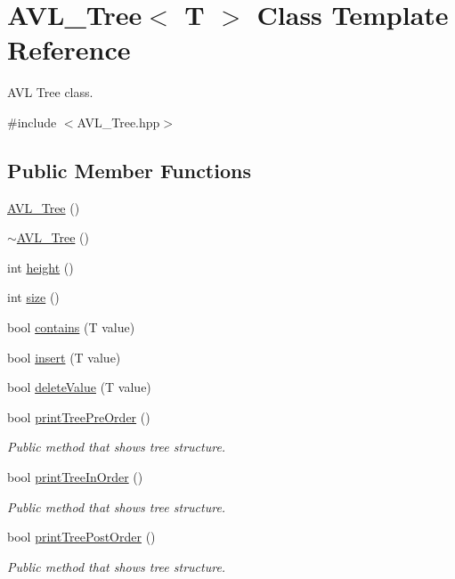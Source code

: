 \hypertarget{class_a_v_l___tree}{}\section{A\+V\+L\+\_\+\+Tree$<$ T $>$ Class Template Reference}
\label{class_a_v_l___tree}


A\+VL Tree class.  




{\ttfamily \#include $<$A\+V\+L\+\_\+\+Tree.\+hpp$>$}

\subsection*{Public Member Functions}
\begin{DoxyCompactItemize}
\item 
\hyperlink{class_a_v_l___tree_a129151ce51f97168c7cd9c84a6b17500}{A\+V\+L\+\_\+\+Tree} ()
\item 
\hyperlink{class_a_v_l___tree_a082bb7b47a8351639059e7063b97a114}{$\sim$\+A\+V\+L\+\_\+\+Tree} ()
\item 
int \hyperlink{class_a_v_l___tree_a74bbdd68e0767102ed33dc9253a76b7e}{height} ()
\item 
int \hyperlink{class_a_v_l___tree_ab865e8048400cb149e11f4bcb5c6f9b2}{size} ()
\item 
bool \hyperlink{class_a_v_l___tree_a2384f725aba6caf38392b77414514815}{contains} (T value)
\item 
bool \hyperlink{class_a_v_l___tree_a95d4d0b742c901ba78fcb2e5a91fed08}{insert} (T value)
\item 
bool \hyperlink{class_a_v_l___tree_a08b1c0b73d635728ea024edf0748e13d}{delete\+Value} (T value)
\item 
bool \hyperlink{class_a_v_l___tree_a2dbb95af3faf3933837ceeb478dd718f}{print\+Tree\+Pre\+Order} ()
\begin{DoxyCompactList}\small\item\em Public method that shows tree structure. \end{DoxyCompactList}\item 
bool \hyperlink{class_a_v_l___tree_a1bffe71cf2c76fa3edf66a2357ae3bc6}{print\+Tree\+In\+Order} ()
\begin{DoxyCompactList}\small\item\em Public method that shows tree structure. \end{DoxyCompactList}\item 
bool \hyperlink{class_a_v_l___tree_a4641e4bcc182de5bcd72424def3e92c1}{print\+Tree\+Post\+Order} ()
\begin{DoxyCompactList}\small\item\em Public method that shows tree structure. \end{DoxyCompactList}\end{DoxyCompactItemize}


